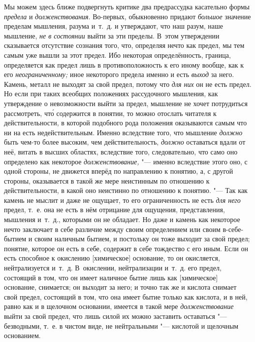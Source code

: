Мы можем здесь ближе подвергнуть критике два предрассудка касательно формы
{\em предела} и {\em долженствования}. Во-первых, обыкновенно придают
{\em большое} значение пределам мышления, разума
и~т.~д. и утверждают, что наш разум, наше мышление,
{\em не в состоянии} выйти за эти пределы. В~этом
утверждении сказывается отсутствие сознания того, что, определяя нечто как предел,
мы тем самым уже вышли за этот предел. Ибо некоторая определённость, граница,
определяется как предел лишь в противоположность к его иному вообще, как
к его {\em неограниченному;} иное некоторого предела
именно и есть {\em выход} за него. Камень, металл не
выходят за свой предел, потому что {\em для них} он не
есть предел. Но если при таких всеобщих положениях рассудочного мышления,
как утверждение о невозможности выйти за предел, мышление не хочет
потрудиться рассмотреть, чт\'{о} содержится в понятии, то можно отослать
читателя к действительности, в которой подобного рода положения оказываются
самым что ни на есть недействительным. Именно вследствие того, что мышление
{\em должно} быть чем-то более высоким, чем
действительность, {\em должно} оставаться вдали от неё,
витать в высших областях, вследствие того, следовательно, что само оно
определено как некоторое {\em долженствование,} "---
именно вследствие этого оно, с одной стороны, не движется вперёд по
направлению к понятию, а, с другой стороны, оказывается в такой же мере
неистинным по отношению к действительности, в какой оно неистинно по
отношению к понятию. "--- Так как камень не мыслит и даже не ощущает, то его
ограниченность не есть {\em для него} предел, т.~е. она
не есть в нём отрицание для ощущения, представления, мышления и~т.~д.,
которыми он не обладает. Но даже и камень как некоторое нечто заключает в
себе различие между своим определением или своим в-себе-бытием и своим
наличным бытием, и постольку он тоже выходит за свой предел; понятие,
которое он есть в себе, содержит в себе тождество с его иным. Если он
есть способное к окислению [химическое] основание, то он окисляется,
нейтрализуется и~т.~д. В~окислении, нейтрализации и~т.~д. его предел,
состоящий в том, что он имеет наличное бытие лишь как [химическое]
основание, снимается; он выходит за него; и точно так же и кислота снимает
свой предел, состоящий в том, что она имеет бытие только как кислота, и в
ней, равно как и в щелочном основании, имеется в такой мере
{\em долженствование} выйти за свой предел, что лишь
силой их можно заставить оставаться "--- безводными, т.~е. в чистом виде, не
нейтральными "--- кислотой и щелочным основанием.

